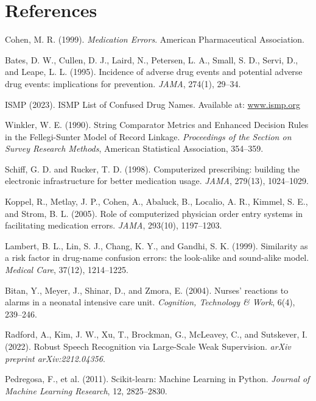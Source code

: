 \documentclass[12pt,a4paper]{report}
\begin{document}
\chapter*{References}
\begin{flushleft}

Cohen, M. R. (1999). \textit{Medication Errors}. American Pharmaceutical Association.

Bates, D. W., Cullen, D. J., Laird, N., Petersen, L. A., Small, S. D., Servi, D., and Leape, L. L. (1995). Incidence of adverse drug events and potential adverse drug events: implications for prevention. \textit{JAMA}, 274(1), 29--34.

ISMP (2023). ISMP List of Confused Drug Names. Available at: \href{http://www.ismp.org}{www.ismp.org}

Winkler, W. E. (1990). String Comparator Metrics and Enhanced Decision Rules in the Fellegi-Sunter Model of Record Linkage. \textit{Proceedings of the Section on Survey Research Methods}, American Statistical Association, 354--359.

Schiff, G. D. and Rucker, T. D. (1998). Computerized prescribing: building the electronic infrastructure for better medication usage. \textit{JAMA}, 279(13), 1024--1029.

Koppel, R., Metlay, J. P., Cohen, A., Abaluck, B., Localio, A. R., Kimmel, S. E., and Strom, B. L. (2005). Role of computerized physician order entry systems in facilitating medication errors. \textit{JAMA}, 293(10), 1197--1203.

Lambert, B. L., Lin, S. J., Chang, K. Y., and Gandhi, S. K. (1999). Similarity as a risk factor in drug-name confusion errors: the look-alike and sound-alike model. \textit{Medical Care}, 37(12), 1214--1225.

Bitan, Y., Meyer, J., Shinar, D., and Zmora, E. (2004). Nurses' reactions to alarms in a neonatal intensive care unit. \textit{Cognition, Technology \& Work}, 6(4), 239--246.

Radford, A., Kim, J. W., Xu, T., Brockman, G., McLeavey, C., and Sutskever, I. (2022). Robust Speech Recognition via Large-Scale Weak Supervision. \textit{arXiv preprint arXiv:2212.04356}.

Pedregosa, F., et al. (2011). Scikit-learn: Machine Learning in Python. \textit{Journal of Machine Learning Research}, 12, 2825--2830.

\end{flushleft}
\end{document}
